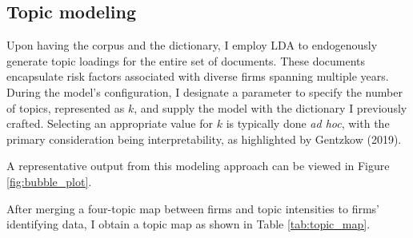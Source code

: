 \documentclass[12pt, letterpaper]{article}
\begin{document}

\subsection{Topic modeling}

Upon having the corpus and the dictionary, I employ LDA to endogenously generate topic loadings for the entire set of documents. These documents encapsulate risk factors associated with diverse firms spanning multiple years. During the model's configuration, I designate a parameter to specify the number of topics, represented as \(k\), and supply the model with the dictionary I previously crafted. Selecting an appropriate value for \(k\) is typically done \textit{ad hoc}, with the primary consideration being interpretability, as highlighted by Gentzkow (2019).

A representative output from this modeling approach can be viewed in Figure \ref{fig:bubble_plot}.



After merging a four-topic map between firms and topic intensities to firms' identifying data, I obtain a topic map as shown in Table \ref{tab:topic_map}.

\tiny

\normalsize




\end{document}

